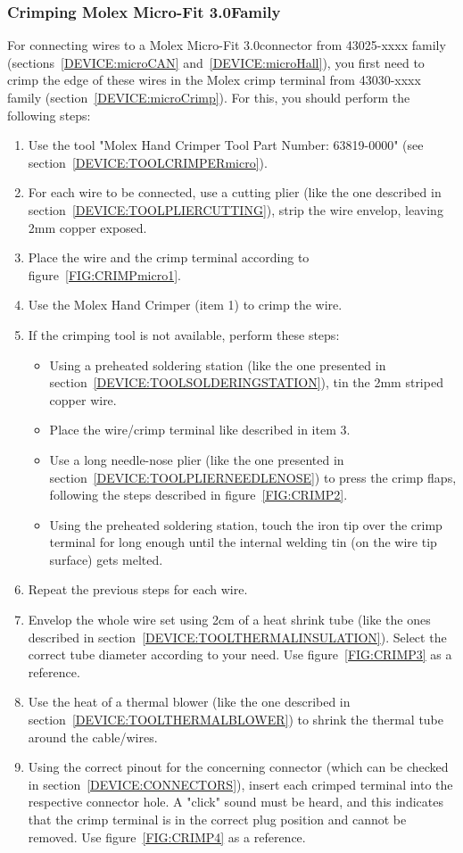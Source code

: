 \subsubsection{Crimping Molex Micro-Fit 3.0\texttrademark Family} \label{CRIMPINGmicro}
For connecting wires to a Molex Micro-Fit 3.0\texttrademark connector from 43025-xxxx family (sections~\ref{DEVICE:microCAN} and~\ref{DEVICE:microHall}), you first need to crimp the edge of these wires in the Molex crimp terminal from 43030-xxxx family (section~\ref{DEVICE:microCrimp}). For this, you should perform the following steps:
\begin{enumerate}
  \item Use the tool "Molex Hand Crimper Tool Part Number: 63819-0000" (see section~\ref{DEVICE:TOOLCRIMPERmicro}).
  \item For each wire to be connected, use a cutting plier (like the one described in section~\ref{DEVICE:TOOLPLIERCUTTING}), strip the wire envelop, leaving 2mm copper exposed.
  \item Place the wire and the crimp terminal according to figure~\ref{FIG:CRIMPmicro1}.
  \item Use the Molex Hand Crimper (item 1) to crimp the wire.
  \item If the crimping tool is not available, perform these steps:
  \begin{itemize}
    \item Using a preheated soldering station (like the one presented in section~\ref{DEVICE:TOOLSOLDERINGSTATION}), tin the 2mm striped copper wire.
    \item Place the wire/crimp terminal like described in item 3.
    \item Use a long needle-nose plier (like the one presented in section~\ref{DEVICE:TOOLPLIERNEEDLENOSE}) to press the crimp flaps, following the steps described in figure~\ref{FIG:CRIMP2}.
    \item Using the preheated soldering station, touch the iron tip over the crimp terminal for long enough until the internal welding tin (on the wire tip surface) gets melted.
  \end{itemize}
  \item Repeat the previous steps for each wire.
  \item Envelop the whole wire set using 2cm of a heat shrink tube (like the ones described in section~\ref{DEVICE:TOOLTHERMALINSULATION}). Select the correct tube diameter according to your need. Use figure~\ref{FIG:CRIMP3} as a reference.
  \item Use the heat of a thermal blower (like the one described in section~\ref{DEVICE:TOOLTHERMALBLOWER}) to shrink the thermal tube around the cable/wires.
  \item Using the correct pinout for the concerning connector (which can be checked in section~\ref{DEVICE:CONNECTORS}), insert each crimped terminal into the respective connector hole. A "click" sound must be heard, and this indicates that the crimp terminal is in the correct plug position and cannot be removed. Use figure~\ref{FIG:CRIMP4} as a reference.
\end{enumerate}
